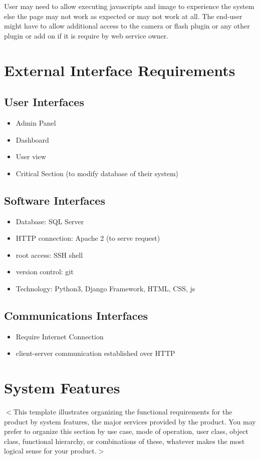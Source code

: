 \documentclass{scrreprt}
\begin{document}
User may need to allow executing javascripts and image to experience the system else the page may not work as expected or may not work at all.
The end-user might have to allow additional access to the camera or flash plugin or any other plugin or add on if it is require by web service owner.
 

\chapter{External Interface Requirements}

\section{User Interfaces}
\begin{itemize}
	\item Admin Panel
	\item Dashboard
	\item User view
	\item Critical Section (to modify database of their system)
\end{itemize}

\section{Software Interfaces}
\begin{itemize}
	\item Database: SQL Server
	\item HTTP connection: Apache 2 (to serve request)
	\item root access: SSH shell
	\item version control: git
	\item Technology: Python3, Django Framework, HTML, CSS, js
\end{itemize}

\section{Communications Interfaces}
\begin{itemize}
	\item Require Internet Connection
	\item client-server communication established over HTTP
\end{itemize}


\chapter{System Features}
$<$This template illustrates organizing the functional requirements for the 
product by system features, the major services provided by the product. You may 
prefer to organize this section by use case, mode of operation, user class, 
object class, functional hierarchy, or combinations of these, whatever makes the 
most logical sense for your product.$>$
\end{document}
